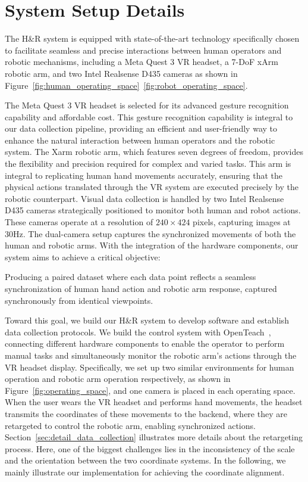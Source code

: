 \appendix

\section{System Setup Details}
\label{sec:detail_system_setup}
The H\&R system is equipped with state-of-the-art technology specifically chosen to facilitate seamless and precise interactions between human operators and robotic mechanisms, including a Meta Quest 3 VR headset, a 7-DoF xArm robotic arm, and two Intel Realsense D435 cameras as shown in Figure~\ref{fig:human_operating_space}~\ref{fig:robot_operating_space}.

The Meta Quest 3 VR headset is selected for its advanced gesture recognition capability and affordable cost. This gesture recognition capability is integral to our data collection pipeline, providing an efficient and user-friendly way to enhance the natural interaction between human operators and the robotic system.
The Xarm robotic arm, which features seven degrees of freedom, provides the flexibility and precision required for complex and varied tasks. This arm is integral to replicating human hand movements accurately, ensuring that the physical actions translated through the VR system are executed precisely by the robotic counterpart.
Visual data collection is handled by two Intel Realsense D435 cameras strategically positioned to monitor both human and robot actions. These cameras operate at a resolution of $240\times424$ pixels, capturing images at 30Hz. The dual-camera setup captures the synchronized movements of both the human and robotic arms. With the integration of the hardware components, our system aims to achieve a critical objective: 

\begin{abox}
Producing a paired dataset where each data point reflects a seamless synchronization of human hand action and robotic arm response, captured synchronously from identical viewpoints.
\end{abox}

Toward this goal, we build our H\&R system to develop software and establish data collection protocols. We build the control system with OpenTeach~\cite{iyer2024open}, connecting different hardware components to enable the operator to perform manual tasks and simultaneously monitor the robotic arm’s actions through the VR headset display. Specifically, we set up two similar environments for human operation and robotic arm operation respectively, as shown in Figure~\ref{fig:operating_space}, and one camera is placed in each operating space. 
When the user wears the VR headset and performs hand movements, the headset transmits the coordinates of these movements to the backend, where they are retargeted to control the robotic arm, enabling synchronized actions.
Section~\ref{sec:detail_data_collection} illustrates more details about the retargeting process. Here, one of the biggest challenges lies in the inconsistency of the scale and the orientation between the two coordinate systems. In the following, we mainly illustrate our implementation for achieving the coordinate alignment.

